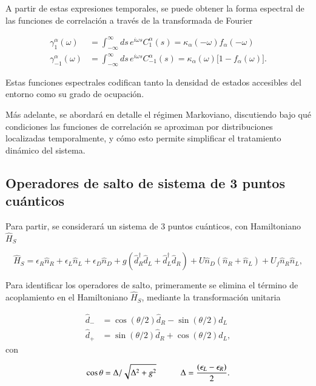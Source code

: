 \begin{appendixs}
A partir de estas expresiones temporales, se puede obtener la forma espectral de las funciones de correlación a través de la transformada de Fourier

\begin{align*}
    \gamma_{1}^{\alpha}(\omega) &= \int_{-\infty}^{\infty} ds\, e^{i \omega s} C_{1}^{\alpha}(s) = \kappa_{\alpha}(-\omega) f_{\alpha}(-\omega) \\
    \gamma_{-1}^{\alpha}(\omega) &= \int_{-\infty}^{\infty} ds\, e^{i \omega s} C_{-1}^{\alpha}(s) = \kappa_{\alpha}(\omega)\big[1 - f_{\alpha}(\omega)\big].
\end{align*}

Estas funciones espectrales codifican tanto la densidad de estados accesibles del entorno como su grado de ocupación.

Más adelante, se abordará en detalle el régimen Markoviano, discutiendo bajo qué condiciones las funciones de correlación se aproximan por distribuciones localizadas temporalmente, y cómo esto permite simplificar el tratamiento dinámico del sistema.

\label{apendix5bathcorre}

\subsection{ Operadores de salto de sistema de 3 puntos cuánticos}
Para partir, se considerará un sistema de 3 puntos cuánticos, con Hamiltoniano $\hat{H}_{S}$

\begin{equation*}
    \hat{H}_{S} = \epsilon_{R}\hat{n}_{R} + \epsilon_{L}\hat{n}_{L} + \epsilon_{D}\hat{n}_{D}  + g(\hat{d}^{\dagger}_{R}\hat{d}_{L} + \hat{d}^{\dagger}_{L}\hat{d}_{R}) + U \hat{n}_{D}(\hat{n}_{R} + \hat{n}_{L}) + U_{f}\hat{n}_{R}\hat{n}_{L},
\end{equation*}

Para identificar los operadores de salto, primeramente se elimina el término de acoplamiento en el Hamiltoniano $\hat{H}_{S}$, mediante la transformación unitaria

\begin{align*}
    \hat{d}_{-} & = \cos(\theta/2)\hat{d}_{R} - \sin(\theta/2)\hat{d}_{L} \\
    \hat{d}_{+} & = \sin(\theta/2)\hat{d}_{R} + \cos(\theta/2)\hat{d}_{L},
\end{align*}
con 

\begin{equation*}
    \cos \theta = \Delta/\sqrt{ \Delta^{2} + g^{2} } \hspace{10mm} \Delta = \frac{(\epsilon_{L}-\epsilon_{R})}{2}.
\end{equation*}


\end{appendixs}
